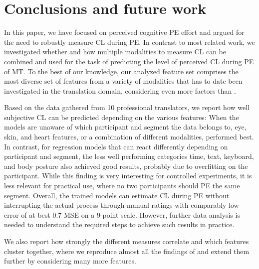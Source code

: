 \documentclass[output=paper]{langsci/langscibook}
\begin{document}
\section{Conclusions and future work}
In this paper, we have focused on perceived cognitive PE effort and argued for the need to robustly measure CL during PE.
In contrast to most related work, we investigated whether and how multiple modalities to measure CL can be combined and used for the task of predicting the level of perceived CL during PE of MT. %
To the best of our knowledge, our analyzed feature set comprises the most diverse set of features from a variety of modalities that has to date been investigated in the translation domain, considering even more factors than \citet{herbig2019mt}.

Based on the data gathered from 10 professional translators, we report how well subjective CL can be predicted depending on the various features: %
When the models are unaware of which participant and segment the data belongs to, eye, skin, and heart features, or a combination of different modalities, performed best.
In contrast, for regression models that can react differently depending on participant and segment, the less well performing categories time, text, keyboard, and body posture also achieved good results, probably due to overfitting on the participant. While this finding is very interesting for controlled experiments, it is less relevant for practical use, where no two participants should PE the same segment.
Overall, the trained models can estimate CL during PE without interrupting the actual process through manual ratings with comparably low error of at best 0.7 MSE on a 9-point scale. However, further data analysis is needed to understand the required steps to achieve such results in practice.

We also report how strongly the different measures correlate and which features cluster together, where we reproduce almost all the findings of \citet{vieira2016measures} and extend them further by considering many more features. %
\end{document}
